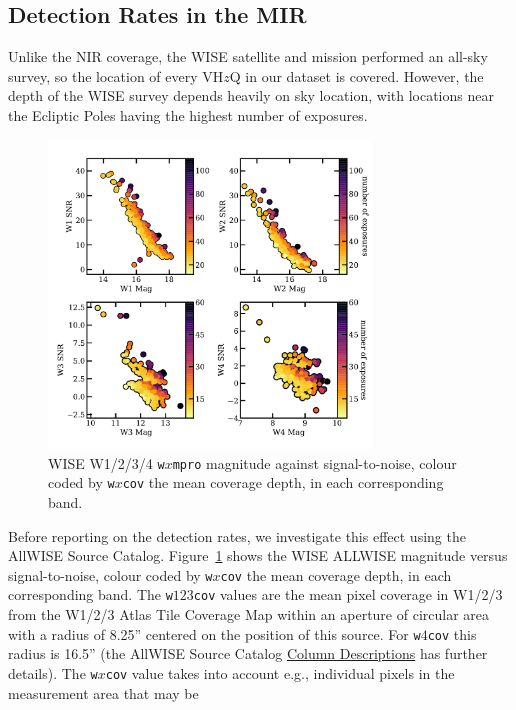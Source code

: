 \documentclass[usenatbib]{mnras}
\begin{document}
\subsection{Detection Rates in the MIR}
Unlike the NIR coverage, the WISE satellite and mission performed an all-sky survey, so the location of every VH$z$Q in our dataset is covered. However, the depth of the WISE survey depends heavily on sky location, with locations near the Ecliptic Poles having the highest number of exposures.

\begin{figure}
  \includegraphics[width=8.6cm, clip,trim=6mm 6mm 0mm 6mm]
  {../detections/WISEmag_vs_coverage_20190605.pdf}
  \centering
  \vspace{-14pt}
  \caption[]{WISE W1/2/3/4 {\tt w$x$mpro} magnitude against signal-to-noise,
    colour coded by {\tt w$x$cov} the mean coverage depth, in each corresponding band.}
  \label{fig:WISEmag_vs_coverage}
\end{figure}
Before reporting on the detection rates, we investigate this effect
using the AllWISE Source Catalog. Figure~\ref{fig:WISEmag_vs_coverage}
shows the WISE ALLWISE magnitude versus signal-to-noise, colour coded
by {\tt w$x$cov} the mean coverage depth, in each corresponding
band. The {\tt w$123$cov} values are the mean pixel coverage in W1/2/3
from the W1/2/3 Atlas Tile Coverage Map within an aperture of circular
area with a radius of 8.25'' centered on the position of this
source. For {\tt w$4$cov} this radius is 16.5'' (the AllWISE Source
Catalog
\href{http://wise2.ipac.caltech.edu/docs/release/allwise/expsup/sec2_1a.html#w2cov}{Column
Descriptions} has further details). The {\tt w$x$cov} value takes into
account e.g., individual pixels in the measurement area that may be
\end{document}
